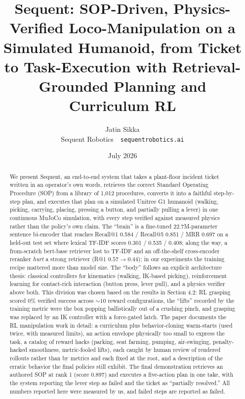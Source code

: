 \documentclass[11pt]{article}
\title{Sequent: SOP-Driven, Physics-Verified Loco-Manipulation on a Simulated Humanoid, from Ticket to Task-Execution with Retrieval-Grounded Planning and Curriculum RL}
\author{Jatin Sikka\\ \small Sequent Robotics \,\textperiodcentered\, \texttt{sequentrobotics.ai}}
\date{July 2026}
\begin{document}
\maketitle

\begin{abstract}
We present Sequent, an end-to-end system that takes a plant-floor incident ticket written in an operator's own words, retrieves the correct Standard Operating Procedure (SOP) from a library of 1{,}012 procedures, converts it into a faithful step-by-step plan, and executes that plan on a simulated Unitree G1 humanoid (walking, picking, carrying, placing, pressing a button, and partially pulling a lever) in one continuous MuJoCo simulation, with every step verified against measured physics rather than the policy's own claim. The ``brain'' is a fine-tuned 22.7M-parameter sentence bi-encoder that reaches Recall@1 0.584 / Recall@5 0.851 / MRR 0.697 on a held-out test set where lexical TF-IDF scores 0.301 / 0.535 / 0.408; along the way, a from-scratch bert-base retriever lost to TF-IDF and an off-the-shelf cross-encoder reranker \emph{hurt} a strong retriever (R@1 $0.57 \to 0.44$); in our experiments the training recipe mattered more than model size. The ``body'' follows an explicit architecture thesis: classical controllers for kinematics (walking, IK-based picking), reinforcement learning for contact-rich interaction (button press, lever pull), and a physics verifier above both. This division was chosen based on the results in Section 4.2: RL grasping scored 0\% verified success across ${\sim}10$ reward configurations, the ``lifts'' recorded by the training metric were the box popping ballistically out of a crushing pinch, and grasping was replaced by an IK controller with a force-gated latch. The paper documents the RL manipulation work in detail: a curriculum plus behavior-cloning warm-starts (used twice, with measured limits), an action envelope physically too small to express the task, a catalog of reward hacks (parking, seat farming, pumping, air-swinging, penalty-hacked smoothness, metric-fooled lifts), each caught by human review of rendered rollouts rather than by metrics and each fixed at the root, and a description of the erratic behavior the final policies still exhibit. The final demonstration retrieves an authored SOP at rank 1 (score 0.897) and executes a five-action plan in one take, with the system reporting the lever step as failed and the ticket as ``partially resolved.'' All numbers reported here were measured by us, and failed steps are reported as failed.
\end{abstract}
\end{document}
